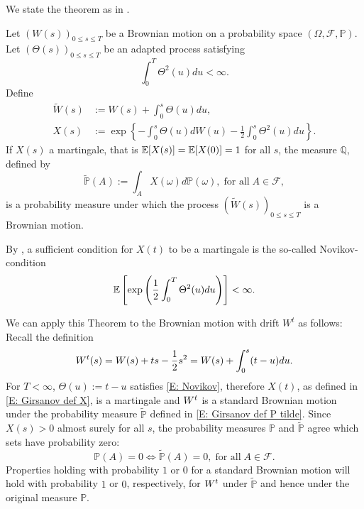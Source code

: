 We state the theorem as in \cite[Theorem 4.2.2, p.66]{Lamberton1996}.
\begin{theorem}[Girsanov] \label{T: Girsanov}
	Let $(W(s))_{0 \leq s \leq T}$ be a Brownian motion on a probability space $(\Omega, \mathcal{F}, \mathbb{P})$.
	Let $(\Theta(s))_{0 \leq s \leq T}$ be an adapted process satisfying
	\begin{equation} \label{E: Girsanov cond Theta}
	\int_{0}^{T} \Theta^2(u)du < \infty.
	\end{equation}
	Define
	\begin{align}
		\tilde{W}(s) &:= W(s) + \int_0^s \Theta(u)du, \label{E: Girsanov def W tilde} \\ 
		X(s) &:= \exp \left\{ -\int_{0}^{s} \Theta(u) dW(u) - \frac{1}{2} \int_0^s \Theta^2(u)du \right\}. \label{E: Girsanov def X}
	\end{align}
	If $X(s)$ a martingale, that is $\mathbb{E}[X(s)] = \mathbb{E}[X(0)] = 1$ for all $s$,
	the measure $\mathbb{Q}$, defined by
	\begin{equation} \label{E: Girsanov def P tilde}
	\tilde{\mathbb{P}}(A) := \int_A X(\omega) d\mathbb{P}(\omega), \; \text{for all} \; A \in \mathcal{F},
	\end{equation}
	is a probability measure under which the process 
	$(\tilde{W}(s))_{0 \leq s \leq T}$
	is a Brownian motion.
\end{theorem}

By \cite[Remark 4.2.3, p.66]{Lamberton.2000}, a sufficient condition for $X(t)$ to be a martingale is the so-called Novikov-condition
\begin{equation} \label{E: Novikov}
\mathbb{E} \left[  \exp \left( \frac{1}{2} \int_{0}^{T} \Theta^2(u)du \right)  \right] < \infty.
\end{equation}

We can apply this Theorem to the Brownian motion with drift $W^t$ as follows:
Recall the definition
\begin{equation}
W^t(s) = W(s) + ts - \frac{1}{2} s^2 = W(s) + \int_0^s (t-u)du.
\end{equation}
For $T<\infty$, $\Theta(u) := t-u$ satisfies \eqref{E: Novikov},
therefore $X(t)$, as defined in \eqref{E: Girsanov def X}, is a martingale and
$W^t$ is a standard Brownian motion under the probability measure $\tilde{\mathbb{P}}$ defined in \eqref{E: Girsanov def P tilde}.
Since $X(s) > 0$ almost surely for all $s$, the probability measures $\mathbb{P}$ and $\tilde{\mathbb{P}}$ agree which sets have probability zero:
\begin{equation} \label{E: P0 = Q0}
\mathbb{P}(A) = 0 \iff \tilde{\mathbb{P}}(A) = 0, \; \text{for all} \; A \in \mathcal{F}.
\end{equation}
Properties holding with probability $1$ or $0$ for a standard Brownian motion will hold with probability $1$ or $0$, respectively,
for $W^t$ under $\tilde{\mathbb{P}}$ and hence under the original measure $\mathbb{P}$.


